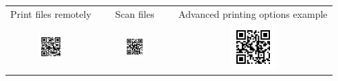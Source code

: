 \documentclass[a4paper]{article}
\begin{document}
\begin{tabulary}{\paperwidth}{CCC}
  \Huge Print files remotely & \Huge Scan files & \Huge Advanced printing options example \\
  \includegraphics[width=0.3\textwidth]{./figures/qr1.png} &
  \includegraphics[width=0.3\textwidth]{./figures/qr2.png} &
  \includegraphics[width=0.3\textwidth]{./figures/qr3.png} \\
\end{tabulary}
\end{document}
